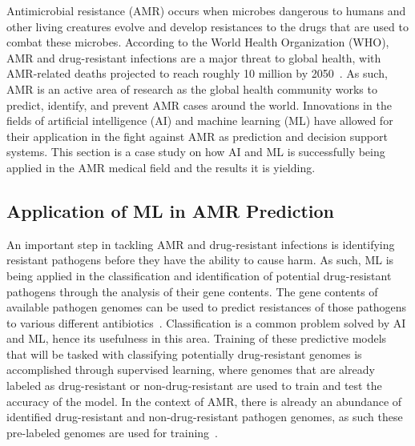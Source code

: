 \documentclass{article}
\begin{document}
Antimicrobial resistance (AMR) occurs when microbes dangerous to humans and other living creatures evolve and develop resistances to the drugs that are used to combat these microbes. According to the World Health Organization (WHO), AMR and drug-resistant infections are a major threat to global health, with AMR-related deaths projected to reach roughly 10 million by 2050~\cite{balkhy_amr_2021}. As such, AMR is an active area of research as the global health community works to predict, identify, and prevent AMR cases around the world. Innovations in the fields of artificial intelligence (AI) and machine learning (ML) have allowed for their application in the fight against AMR as prediction and decision support systems. This section is a case study on how AI and ML is successfully being applied in the AMR medical field and the results it is yielding.

\subsection{Application of ML in AMR Prediction}

An important step in tackling AMR and drug-resistant infections is identifying resistant pathogens before they have the ability to cause harm. As such, ML is being applied in the classification and identification of potential drug-resistant pathogens through the analysis of their gene contents. The gene contents of available pathogen genomes can be used to predict resistances of those pathogens to various different antibiotics~\cite{kim_machine_2022}. Classification is a common problem solved by AI and ML, hence its usefulness in this area. Training of these predictive models that will be tasked with classifying potentially drug-resistant genomes is accomplished through supervised learning, where genomes that are already labeled as drug-resistant or non-drug-resistant are used to train and test the accuracy of the model. In the context of AMR, there is already an abundance of identified drug-resistant and non-drug-resistant pathogen genomes, as such these pre-labeled genomes are used for training~\cite{kim_machine_2022}.
\end{document}
